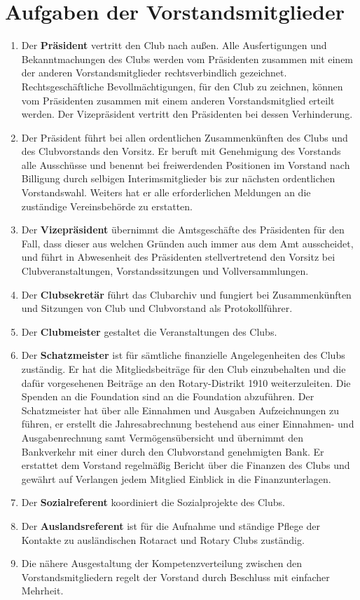 \documentclass{statutclass}
\begin{document}
\section{Aufgaben der Vorstandsmitglieder}
\begin{enumerate}
    \item Der \textbf{Präsident} vertritt den Club nach außen. Alle Ausfertigungen und Bekanntmachungen des Clubs werden vom Präsidenten zusammen mit einem der anderen Vorstandsmitglieder rechtsverbindlich gezeichnet. Rechtsgeschäftliche Bevollmächtigungen, für den Club zu zeichnen, können vom Präsidenten zusammen mit einem anderen Vorstandsmitglied erteilt werden. Der Vizepräsident vertritt den Präsidenten bei dessen Verhinderung.
    \item Der Präsident führt bei allen ordentlichen Zusammenkünften des Clubs und des Clubvorstands den Vorsitz. Er beruft mit Genehmigung des Vorstands alle Ausschüsse und benennt bei freiwerdenden Positionen im Vorstand nach Billigung durch selbigen Interimsmitglieder bis zur nächsten ordentlichen Vorstandswahl. Weiters hat er alle erforderlichen Meldungen an die zuständige Vereinsbehörde zu erstatten.
    \item Der \textbf{Vizepräsident} übernimmt die Amtsgeschäfte des Präsidenten für den Fall, dass dieser aus welchen Gründen auch immer aus dem Amt ausscheidet, und führt in Abwesenheit des Präsidenten stellvertretend den Vorsitz bei Clubveranstaltungen, Vorstandssitzungen und Vollversammlungen.
    \item Der \textbf{Clubsekretär} führt das Clubarchiv und fungiert bei Zusammenkünften und Sitzungen von Club und Clubvorstand als Protokollführer.
    \item Der \textbf{Clubmeister} gestaltet die Veranstaltungen des Clubs.
    \item Der \textbf{Schatzmeister} ist für sämtliche finanzielle Angelegenheiten des Clubs zuständig. Er hat die Mitgliedsbeiträge für den Club einzubehalten und die dafür vorgesehenen Beiträge an den Rotary-Distrikt 1910 weiterzuleiten. Die Spenden an die Foundation sind an die Foundation abzuführen. Der Schatzmeister hat über alle Einnahmen und Ausgaben Aufzeichnungen zu führen, er erstellt die Jahresabrechnung bestehend aus einer Einnahmen- und Ausgabenrechnung samt Vermögensübersicht und übernimmt den Bankverkehr mit einer durch den Clubvorstand genehmigten Bank. Er erstattet dem Vorstand regelmäßig Bericht über die Finanzen des Clubs und gewährt auf Verlangen jedem Mitglied Einblick in die Finanzunterlagen.
    \item Der \textbf{Sozialreferent} koordiniert die Sozialprojekte des Clubs.
    \item Der \textbf{Auslandsreferent} ist für die Aufnahme und ständige Pflege der Kontakte zu ausländischen Rotaract und Rotary Clubs zuständig.
    \item Die nähere Ausgestaltung der Kompetenzverteilung zwischen den Vorstandsmitgliedern regelt der Vorstand durch Beschluss mit einfacher Mehrheit.
\end{enumerate}
\end{document}
